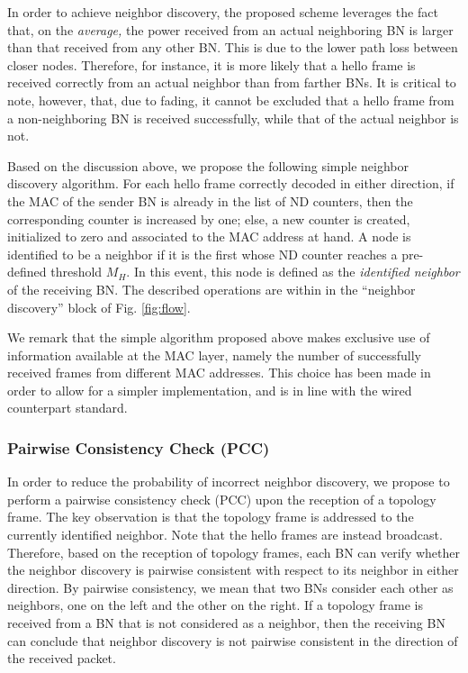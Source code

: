 \documentclass[10pt,english,two column]{IEEEtran}
\begin{document}
In order to achieve neighbor discovery, the proposed scheme leverages
the fact that, on the\emph{ average, }the power received from an actual
neighboring BN is larger than that received from any other BN. This
is due to the lower path loss between closer nodes. Therefore, for
instance, it is more likely that a hello frame is received correctly
from an actual neighbor than from farther BNs. It is critical to note,
however, that, due to fading, it cannot be excluded that a hello frame
from a non-neighboring BN is received successfully, while that of
the actual neighbor is not. 

Based on the discussion above, we propose the following simple neighbor
discovery algorithm. For each hello frame correctly decoded in either
direction, if the MAC of the sender BN is already in the list of ND
counters, then the corresponding counter is increased by one; else,
a new counter is created, initialized to zero and associated to the
MAC address at hand. A node is identified to be a neighbor if it is
the first whose ND counter reaches a pre-defined threshold $M_{H}$.
In this event, this node is defined as the \textit{identified neighbor}
of the receiving BN. The described operations are within in the ``neighbor
discovery'' block of Fig. \ref{fig:flow}.

We remark that the simple algorithm proposed above makes exclusive
use of information available at the MAC layer, namely the number of
successfully received frames from different MAC addresses. This choice
has been made in order to allow for a simpler implementation, and
is in line with the wired counterpart standard. 


\subsubsection{Pairwise Consistency Check (PCC) \label{sub:Pairwise-Consistency-Check}}

In order to reduce the probability of incorrect neighbor discovery,
we propose to perform a pairwise consistency check (PCC) upon the
reception of a topology frame. The key observation is that the topology
frame is addressed to the currently identified neighbor. Note that
the hello frames are instead broadcast. Therefore, based on the reception
of topology frames, each BN can verify whether the neighbor discovery
is pairwise consistent with respect to its neighbor in either direction.
By pairwise consistency, we mean that two BNs consider each other
as neighbors, one on the left and the other on the right. If a topology
frame is received from a BN that is not considered as a neighbor,
then the receiving BN can conclude that neighbor discovery is not
pairwise consistent in the direction of the received packet. 
\end{document}
